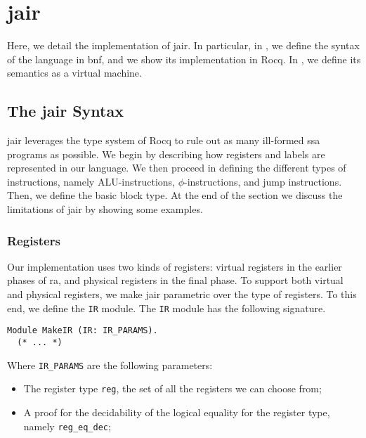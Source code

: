 
\chapter{\gls{jair}}
\label{cha:jair}

Here, we detail the implementation of \gls{jair}. In particular, in , we define the syntax of the language in \gls{bnf}, and we show its implementation in Rocq. In , we define its semantics as a virtual machine.

\section{The \gls{jair} Syntax}
\label{sec:jair-syntax}

\gls{jair} leverages the type system of Rocq to rule out as many ill-formed \gls{ssa} programs as possible. We begin by describing how registers and labels are represented in our language. We then proceed in defining the different types of instructions, namely ALU-instructions, $\phi$-instructions, and jump instructions. Then, we define the basic block type.
At the end of the section we discuss the limitations of \gls{jair} by showing some examples.

\subsection{Registers}

Our implementation uses two kinds of registers: virtual registers in the earlier phases of \gls{ra}, and physical registers in the final phase. To support both virtual and physical registers, we make \gls{jair} parametric over the type of registers. To this end, we define the \texttt{IR} module. The \texttt{IR} module has the following signature.

\begin{lstlisting}[style=Rocq]
Module MakeIR (IR: IR_PARAMS).
  (* ... *)
\end{lstlisting}

Where \texttt{IR\_PARAMS} are the following parameters:
\begin{itemize}
    \item The register type \texttt{reg}, the set of all the registers we can choose from;
    \item A proof for the decidability of the logical equality for the register type, namely \texttt{reg\_eq\_dec};
\end{itemize}

